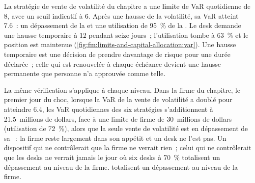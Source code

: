 La stratégie de vente de volatilité du chapitre a une limite de VaR quotidienne de 8, avec un seuil indicatif à 6. Après une hausse de la volatilité, sa VaR atteint 7.6~: un dépassement de la
 et une utilisation de 95~\% de la . Le desk demande une hausse temporaire à 12 pendant seize jours~; l'utilisation tombe à 63~\% et le
position est maintenue (\cref{fig:fm:limits-and-capital-allocation:var}). Une hausse temporaire est une décision de prendre davantage de risque pour une durée déclarée~; celle qui
est renouvelée à chaque échéance devient une hausse permanente que personne n'a approuvée comme telle.

\begin{omfigure}

\label{fig:fm:limits-and-capital-allocation:var}
\end{omfigure}

La même vérification s'applique à chaque niveau. Dans la firme du chapitre, le premier jour du choc, lorsque la VaR de la vente de volatilité a doublé pour atteindre 6.4,
les VaR quotidiennes des six stratégies s'additionnent à 21.5~millions de dollars, face à une
limite de firme de 30~millions de dollars (utilisation de 72~\%), alors que la seule vente de volatilité est en dépassement de sa ~: la firme reste largement dans son appétit et un desk ne l'est pas. Un dispositif qui ne contrôlerait que la firme ne verrait rien~; celui qui ne contrôlerait que les desks ne verrait jamais le jour où six desks à 70~\%
totalisent un dépassement au niveau de la firme.
totalisent un dépassement au niveau de la firme.

